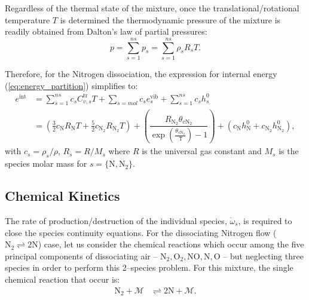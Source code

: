 \documentclass[10pt]{article}
\newcommand{\T}{\,\mathtt{T}}
\begin{document}
Regardless of the thermal state of the mixture, once the translational/rotational temperature $T$ is determined the thermodynamic pressure of the mixture is readily obtained from Dalton's law of partial pressures:
\begin{equation}
 p = \sum_{s=1}^{ns} p_s = \sum_{s=1}^{ns} \rho_s R_s T .
 \label{eq:p_eq_state}
\end{equation}


Therefore, for the Nitrogen dissociation, the expression for internal energy (\ref{eq:energy_partition}) simplifies to:
\begin{equation}
 \label{eq:rE-T-Tv-relationship}
\begin{split}
 e^{\text{int}} &= \sum_{s=1}^{ns} c_s C^{\text{tr}}_{v,s} T + \sum_{s=mol} c_s e^{\text{vib}}_s + \sum_{s=1}^{ns} c_s h^0_s\\
&=\left(\frac{3}{2} c_{\text{N}} R_{\text{N}} T + \frac{5}{2} c_{\text{N}_2} R_{\text{N}_2} T\right)+ \left(\dfrac{R_{\text{N}_2} \theta_{v \text{N}_2}}{\exp\left(\frac{\theta_{v \text{N}_2}}{\T}\right)-1} \right)+ \left(   c_{\text{N}} h_{\text{N}}^0 + c_{\text{N}_2} h_{\text{N}_2}^0 \right),
\end{split}
\end{equation}
with $c_s=\rho_s/\rho$, $R_s = R/M_s$ where $R$ is the universal gas constant and $M_s$ is the species molar mass for $s=\{\text{N},\text{N}_2\}$.




\subsection{Chemical Kinetics}
The rate of production/destruction of the individual species, $\dot{\omega}_s$, is required to close the species continuity equations. For the dissociating Nitrogen flow ($  \text{N}_2 \rightleftharpoons 2 \text{N}$) case, let us consider the chemical reactions which occur among the five principal components of dissociating air -- $\text{N}_2,\text{O}_2,\text{NO},\text{N},\text{O}$ -- but neglecting three species in order to perform this 2--species problem. For this mixture, the single chemical reaction that occur is:
\begin{align*}
 \text{N}_2 + \mathcal{M} &\rightleftharpoons 2\text{N} + \mathcal{M} .
\end{align*}
\end{document}
